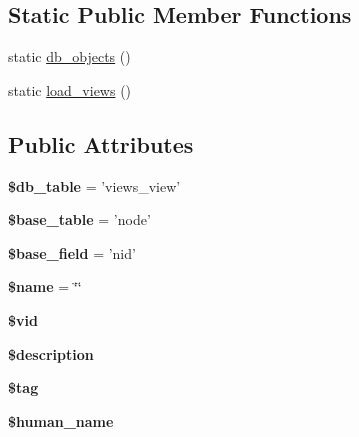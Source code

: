 \subsection*{Static Public Member Functions}
\begin{DoxyCompactItemize}
\item 
static \hyperlink{classview_a1f89288ab73c605c0271c6ce51d980a1}{db\_\-objects} ()
\item 
static \hyperlink{classview_a2e9d3d4c2d3c490b4d395f034691920a}{load\_\-views} ()
\end{DoxyCompactItemize}
\subsection*{Public Attributes}
\begin{DoxyCompactItemize}
\item 
\hypertarget{classview_aa021eaf45fa9c47aeecacd1d4d4fd1ae}{
{\bfseries \$db\_\-table} = 'views\_\-view'}
\label{classview_aa021eaf45fa9c47aeecacd1d4d4fd1ae}

\item 
\hypertarget{classview_aa38dcbd852fcf35c52640d872825db05}{
{\bfseries \$base\_\-table} = 'node'}
\label{classview_aa38dcbd852fcf35c52640d872825db05}

\item 
\hypertarget{classview_a9cc7b740726da6ab9379c9220300adbf}{
{\bfseries \$base\_\-field} = 'nid'}
\label{classview_a9cc7b740726da6ab9379c9220300adbf}

\item 
\hypertarget{classview_a3375be95348a8dd141d0ddfca30bfd70}{
{\bfseries \$name} = \char`\"{}\char`\"{}}
\label{classview_a3375be95348a8dd141d0ddfca30bfd70}

\item 
\hypertarget{classview_ab83c480f7259a354f83aea93c56cd62a}{
{\bfseries \$vid}}
\label{classview_ab83c480f7259a354f83aea93c56cd62a}

\item 
\hypertarget{classview_a6d60b06d23fb9dee7ad2b179716ff806}{
{\bfseries \$description}}
\label{classview_a6d60b06d23fb9dee7ad2b179716ff806}

\item 
\hypertarget{classview_a89adfb9bced3a53b3aef648ea5c52ae3}{
{\bfseries \$tag}}
\label{classview_a89adfb9bced3a53b3aef648ea5c52ae3}

\item 
\hypertarget{classview_a1b780f5e73bcdb1c5316fb4b81d8fb39}{
{\bfseries \$human\_\-name}}
\label{classview_a1b780f5e73bcdb1c5316fb4b81d8fb39}


\end{DoxyCompactItemize}
